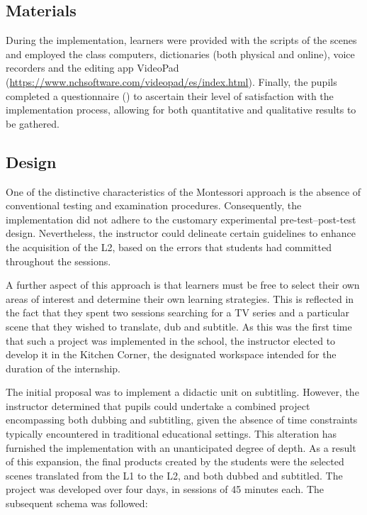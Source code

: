 \subsection{Materials}\label{sub-sec-materials}

During the implementation, learners were provided with the scripts of
the scenes and employed the class computers, dictionaries (both physical
and online), voice recorders and the editing app VideoPad
(\url{https://www.nchsoftware.com/videopad/es/index.html}). Finally, the
pupils completed a questionnaire () to ascertain their level of
satisfaction with the implementation process, allowing for both
quantitative and qualitative results to be gathered.

\subsection{Design}\label{sub-sec-design}

One of the distinctive characteristics of the Montessori approach is the
absence of conventional testing and examination procedures.
Consequently, the implementation did not adhere to the customary
experimental pre-test--post-test design. Nevertheless, the instructor
could delineate certain guidelines to enhance the acquisition of the L2,
based on the errors that students had committed throughout the sessions.

A further aspect of this approach is that learners must be free to
select their own areas of interest and determine their own learning
strategies. This is reflected in the fact that they spent two sessions
searching for a TV series and a particular scene that they wished to
translate, dub and subtitle. As this was the first time that such a
project was implemented in the school, the instructor elected to develop
it in the Kitchen Corner, the designated workspace intended for the
duration of the internship.

The initial proposal was to implement a didactic unit on subtitling.
However, the instructor determined that pupils could undertake a
combined project encompassing both dubbing and subtitling, given the
absence of time constraints typically encountered in traditional
educational settings. This alteration has furnished the implementation
with an unanticipated degree of depth. As a result of this expansion,
the final products created by the students were the selected scenes
translated from the L1 to the L2, and both dubbed and subtitled. The
project was developed over four days, in sessions of 45 minutes each.
The subsequent schema was followed:

